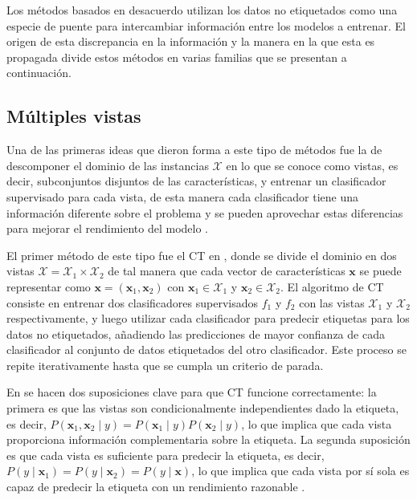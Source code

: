 Los métodos basados en desacuerdo utilizan los datos no etiquetados como una especie de puente para intercambiar información entre los modelos a entrenar. El origen de esta discrepancia en la información y la manera en la que esta es propagada divide estos métodos en varias familias que se presentan a continuación.

\subsection{Múltiples vistas}

Una de las primeras ideas que dieron forma a este tipo de métodos fue la de descomponer el dominio de las instancias $\mathcal{X}$ en lo que se conoce como vistas, es decir, subconjuntos disjuntos de las características, y entrenar un clasificador supervisado para cada vista, de esta manera cada clasificador tiene una información diferente sobre el problema y se pueden aprovechar estas diferencias para mejorar el rendimiento del modelo \cite{zhou2010semi}. 

El primer método de este tipo fue el \gls{CT} en \citet{blum1998combining}, donde se divide el dominio en dos vistas $\mathcal{X} = \mathcal{X}_1 \times \mathcal{X}_2$ de tal manera que cada vector de características $\mathbf{x}$ se puede representar como $\mathbf{x} = (\mathbf{x}_1, \mathbf{x}_2)$ con $\mathbf{x}_1 \in \mathcal{X}_1$ y $\mathbf{x}_2 \in \mathcal{X}_2$. El algoritmo de \gls{CT} consiste en entrenar dos clasificadores supervisados $f_1$ y $f_2$ con las vistas $\mathcal{X}_1$ y $\mathcal{X}_2$ respectivamente, y luego utilizar cada clasificador para predecir etiquetas para los datos no etiquetados, añadiendo las predicciones de mayor confianza de cada clasificador al conjunto de datos etiquetados del otro clasificador. Este proceso se repite iterativamente hasta que se cumpla un criterio de parada.

En \citet{blum1998combining} se hacen dos suposiciones clave para que \gls{CT} funcione correctamente: la primera es que las vistas son condicionalmente independientes dado la etiqueta, es decir, $P(\mathbf{x}_1, \mathbf{x}_2 \mid y) = P(\mathbf{x}_1 \mid y) P(\mathbf{x}_2 \mid y)$, lo que implica que cada vista proporciona información complementaria sobre la etiqueta. La segunda suposición es que cada vista es suficiente para predecir la etiqueta, es decir, $P(y \mid \mathbf{x}_1) = P(y \mid \mathbf{x}_2) = P(y \mid \mathbf{x})$, lo que implica que cada vista por sí sola es capaz de predecir la etiqueta con un rendimiento razonable \cite{zhu2009introduction}. 

